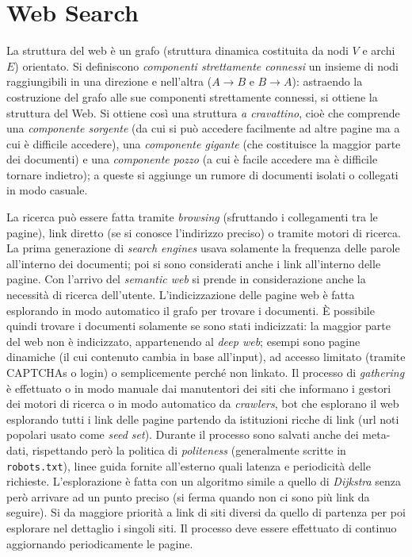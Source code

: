 \documentclass[11pt, a4page]{article}
\begin{document}
\newpage
\part{Web Search}
La struttura del web è un grafo (struttura dinamica costituita da nodi $V$ e archi $E$) orientato.
Si definiscono \textit{componenti strettamente connessi} un insieme di nodi  raggiungibili in una direzione e nell'altra ($A \to B$ e $B \to A$): astraendo la costruzione del grafo alle sue componenti strettamente connessi, si ottiene la struttura del Web.
Si ottiene così una struttura \textit{a cravattino}, cioè che comprende una \textit{componente sorgente} (da cui si può accedere facilmente ad altre pagine ma a cui è difficile accedere), una \textit{componente gigante} (che costituisce la maggior parte dei documenti) e una \textit{componente pozzo} (a cui è facile accedere ma è difficile tornare indietro); a queste si aggiunge un rumore di documenti isolati o collegati in modo casuale.

La ricerca può essere fatta tramite \textit{browsing} (sfruttando i collegamenti tra le pagine), link diretto (se si conosce l'indirizzo preciso) o tramite motori di ricerca.
La prima generazione di \textit{search engines} usava solamente la frequenza delle parole all'interno dei documenti; poi si sono considerati anche i link all'interno delle pagine.
Con l'arrivo del \textit{semantic web} si prende in considerazione anche la necessità di ricerca dell'utente.
L'indicizzazione delle pagine web è fatta esplorando in modo automatico il grafo per trovare i documenti.
È possibile quindi trovare i documenti solamente se sono stati indicizzati: la maggior parte del web non è indicizzato, appartenendo al \textit{deep web}; esempi sono pagine dinamiche (il cui contenuto cambia in base all'input), ad accesso limitato (tramite CAPTCHAs o login) o semplicemente perché non linkato.
Il processo di \textit{gathering} è effettuato o in modo manuale dai manutentori dei siti che informano i gestori dei motori di ricerca o in modo automatico da \textit{crawlers}, bot che esplorano il web esplorando tutti i link delle pagine partendo da istituzioni ricche di link (url noti popolari usato come \textit{seed set}).
Durante il processo sono salvati anche dei meta-dati, rispettando però la politica di \textit{politeness} (generalmente scritte in \verb|robots.txt|), linee guida fornite all'esterno quali latenza e periodicità delle richieste.
L'esplorazione è fatta con un algoritmo simile a quello di \textit{Dijkstra} senza però arrivare ad un punto preciso (si ferma quando non ci sono più link da seguire).
Si da maggiore priorità a link di siti diversi da quello di partenza per poi esplorare nel dettaglio i singoli siti.
Il processo deve essere effettuato di continuo aggiornando periodicamente le pagine.
\end{document}
